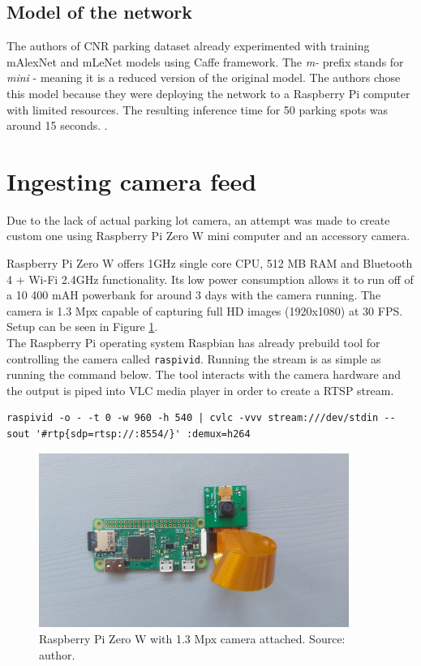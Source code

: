 \documentclass[thesis=M,english]{FITthesis}[2019/03/06]
\begin{document}
\subsection{Model of the network}
The authors of CNR parking dataset already experimented with training mAlexNet and mLeNet models using Caffe framework. The \textit{m-} prefix stands for \textit{mini} - meaning it is a reduced version of the original model. The authors chose this model because they were deploying the network to a Raspberry Pi computer with limited resources. The resulting inference time for 50 parking spots was around 15 seconds. \cite{cit:cnrparkclassification}.

\section{Ingesting camera feed}
Due to the lack of actual parking lot camera, an attempt was made to create custom one using Raspberry Pi Zero W mini computer and an accessory camera.

Raspberry Pi Zero W offers 1GHz single core CPU, 512 MB RAM and Bluetooth 4 + Wi-Fi 2.4GHz functionality. Its low power consumption allows it to run off of a 10 400 mAH powerbank for around 3 days with the camera running. The camera is 1.3 Mpx capable of capturing full HD images (1920x1080) at 30 FPS. Setup can be seen in Figure \ref{label:raspiwithcam}.\\

The Raspberry Pi operating system Raspbian has already prebuild tool for controlling the camera called \texttt{raspivid}. Running the stream is as simple as running the command below. The tool interacts with the camera hardware and the output is piped into VLC media player in order to create a RTSP stream. 

\begin{verbatim}
raspivid -o - -t 0 -w 960 -h 540 | cvlc -vvv stream:///dev/stdin --sout '#rtp{sdp=rtsp://:8554/}' :demux=h264
\end{verbatim}


\begin{figure}[ht]
	\centering
	\includegraphics[width=0.9\textwidth]{imgs/custom-ipcamera.jpg}
	\caption{Raspberry Pi Zero W with 1.3 Mpx camera attached. Source:
	author.}
	\label{label:raspiwithcam}
\end{figure}
\end{document}

